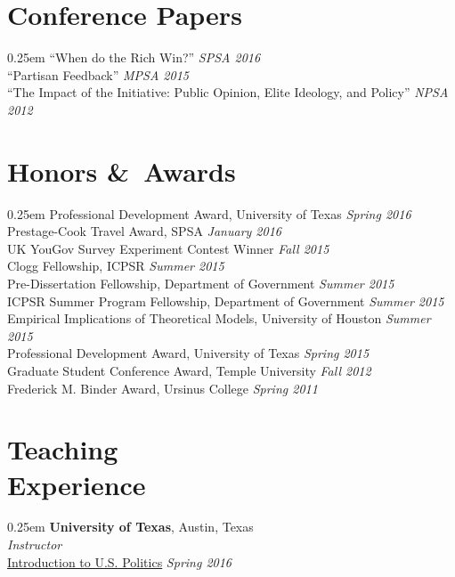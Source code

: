\documentclass[article,11pt,oneside]{memoir}
\begin{document}
\bigskip{}

\section{Conference Papers}{0.25em}
``When do the Rich Win?'' \hfill \emph{SPSA 2016}\\
``Partisan Feedback'' \hfill \emph{MPSA 2015}\\
``The Impact of the Initiative: Public Opinion, Elite Ideology,
  and Policy'' \hfill \emph{NPSA 2012}

\bigskip{}

\section{Honors \&~Awards}{0.25em}
Professional Development Award, University of Texas \hfill
\emph{Spring 2016} \\
Prestage-Cook Travel Award, SPSA
\hfill \emph{January 2016} \\
UK YouGov Survey Experiment Contest Winner \hfill \emph{Fall 2015} \\
Clogg Fellowship, ICPSR \hfill \emph{Summer 2015} \\
Pre-Dissertation Fellowship, Department of Government \hfill
\emph{Summer 2015} \\
ICPSR Summer Program Fellowship, Department of Government \hfill
\emph{Summer 2015} \\
Empirical Implications of Theoretical Models, University of
Houston  \hfill \emph{Summer 2015} \\
Professional Development Award, University of Texas \hfill
\emph{Spring 2015} \\
Graduate Student Conference Award, Temple University \hfill \emph{Fall
  2012} \\
Frederick M. Binder Award, Ursinus College \hfill \emph{Spring 2011}

\bigskip{}

\section{Teaching\\Experience}{0.25em}
\textbf{University of Texas}, Austin, Texas\\
\emph{Instructor}\\
\href{http://jabranham.com/GOV310L}{Introduction to U.S. Politics} \hfill \emph{Spring 2016}\\
\end{document}
